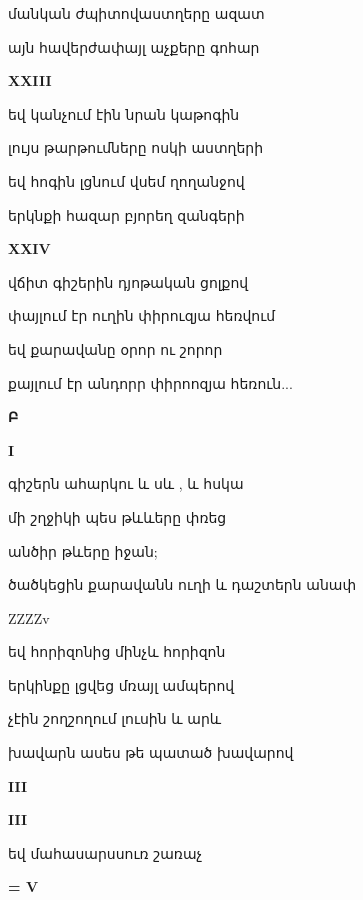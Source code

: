մանկան ժպիտովաստղերը ազատ


այն հավերժափայլ  աչքերը գոհար 



\centerline {\bf XXIII}



 եվ կանչում էին նրան  կաթոգին 



 լույս թարթումները    ոսկի աստղերի





  եվ հոգին լցնում  վսեմ ղողանջով 




  երկնքի հազար բյորեղ զանգերի






\centerline {\bf  XXIV   }

վճիտ գիշերին դյոթական ցոլքով




փայլում էր   ուղին փիրուզյա   հեռվում





եվ քարավանը օրոր  ու  շորոր 




քայլում էր  անդորր փիրոոզյա հեռուն...









\centerline {\bf Բ}   

\centerline {\bf  I}


գիշերն ահարկու և  սև , և հսկա



մի շղջիկի պես թևևերը փռեց



անծիր թևերը իջան; 




ծածկեցին քարավանն   ուղի   և դաշտերն անափ



 ZZZZv


եվ հորիզոնից մինչև  հորիզոն 



երկինքը   լցվեց  մռայլ  ամպերով


չէին  շողշողում լուսին և արև



խավարն ասես թե պատած խավարով


\centerline {\bf III}





\centerline  {\bf         III}

եվ մահասարսսուռ շառաչ


   

\centerline  {\bf=     V  }







                                                                                                                                                                     \bye
